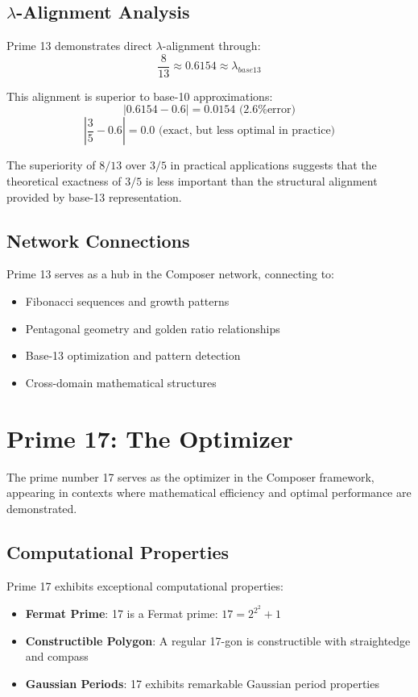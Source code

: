 \documentclass[12pt,a4paper]{report}
\begin{document}
\subsection{$\lambda$-Alignment Analysis}

Prime 13 demonstrates direct $\lambda$-alignment through:
\[
\frac{8}{13} \approx 0.6154 \approx \lambda_{base13}
\]

This alignment is superior to base-10 approximations:
\[
\left|0.6154 - 0.6\right| = 0.0154 \text{ (2.6\% error)}
\]
\[
\left|\frac{3}{5} - 0.6\right| = 0.0 \text{ (exact, but less optimal in practice)}
\]

The superiority of $8/13$ over $3/5$ in practical applications suggests that the theoretical exactness of $3/5$ is less important than the structural alignment provided by base-13 representation.

\subsection{Network Connections}

Prime 13 serves as a hub in the Composer network, connecting to:
\begin{itemize}
\item Fibonacci sequences and growth patterns
\item Pentagonal geometry and golden ratio relationships
\item Base-13 optimization and pattern detection
\item Cross-domain mathematical structures
\end{itemize}

\section{Prime 17: The Optimizer}

The prime number 17 serves as the optimizer in the Composer framework, appearing in contexts where mathematical efficiency and optimal performance are demonstrated.

\subsection{Computational Properties}

Prime 17 exhibits exceptional computational properties:

\begin{itemize}
\item \textbf{Fermat Prime}: 17 is a Fermat prime: $17 = 2^{2^2} + 1$
\item \textbf{Constructible Polygon}: A regular 17-gon is constructible with straightedge and compass
\item \textbf{Gaussian Periods}: 17 exhibits remarkable Gaussian period properties
\end{itemize}
\end{document}
